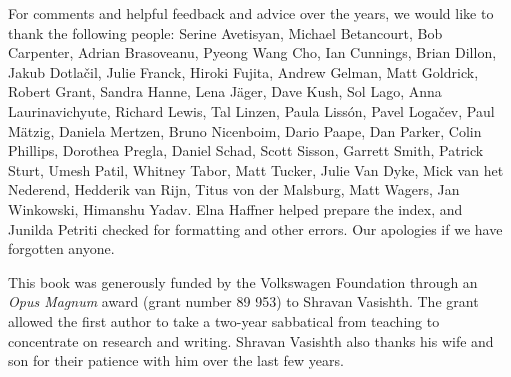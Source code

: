 For comments and helpful feedback and advice over the years, we would like to thank the following people: 
Serine Avetisyan,
Michael Betancourt, 
Bob Carpenter, 
Adrian Brasoveanu, 
Pyeong Wang Cho,
Ian Cunnings,
Brian Dillon,
Jakub Dotla\v cil,
Julie Franck,
Hiroki Fujita, 
Andrew Gelman, 
Matt Goldrick,
Robert Grant,
Sandra Hanne,
Lena J\"ager,
Dave Kush,
Sol Lago,
Anna Laurinavichyute,
Richard Lewis, 
Tal Linzen, 
Paula Liss\'on,
Pavel Loga{\v c}ev,
Paul M\"atzig,
Daniela Mertzen,
Bruno Nicenboim,
Dario Paape,
Dan Parker,
Colin Phillips,
Dorothea Pregla,
Daniel Schad,
Scott Sisson, 
Garrett Smith,
Patrick Sturt,
Umesh Patil,
Whitney Tabor,
Matt Tucker,
Julie Van Dyke,
Mick van het Nederend,
Hedderik van Rijn,
Titus von der Malsburg,
Matt Wagers,
Jan Winkowski,
Himanshu Yadav. Elna Haffner helped prepare the index, and Junilda Petriti checked for formatting and other errors. 
Our apologies if we have forgotten anyone.


This book was generously funded by the Volkswagen Foundation through an \textit{Opus Magnum} award (grant number 89 953) to Shravan Vasishth. The grant  allowed the first author to take a two-year sabbatical from teaching to concentrate on research and writing. Shravan Vasishth also thanks his wife and son for their patience  with him over the last few years.
